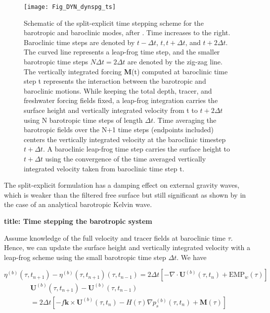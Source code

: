 \documentclass[../tex_main/NEMO_manual]{subfiles}
\begin{document}
\begin{figure}[!t] 	\begin{center}
\texttt{[image: Fig\_DYN\_dynspg\_ts]}
\caption{	 \protect\label{fig:DYN_dynspg_ts}
Schematic of the split-explicit time stepping scheme for the barotropic and baroclinic modes, 
after \citet{Griffies2004}. Time increases to the right. Baroclinic time steps are denoted by 
$t-\Delta t$, $t, t+\Delta t$, and $t+2\Delta t$. The curved line represents a leap-frog time step, 
and the smaller barotropic time steps $N \Delta t=2\Delta t$ are denoted by the zig-zag line. 
The vertically integrated forcing \textbf{M}(t) computed at baroclinic time step t represents 
the interaction between the barotropic and baroclinic motions. While keeping the total depth, 
tracer, and freshwater forcing fields fixed, a leap-frog integration carries the surface height 
and vertically integrated velocity from t to $t+2 \Delta t$ using N barotropic time steps of length 
$\Delta t$. Time averaging the barotropic fields over the N+1 time steps (endpoints included) 
centers the vertically integrated velocity at the baroclinic timestep $t+\Delta t$. 
A baroclinic leap-frog time step carries the surface height to $t+\Delta t$ using the convergence 
of the time averaged vertically integrated velocity taken from baroclinic time step t. }
\end{center}
\end{figure}

The split-explicit formulation has a damping effect on external gravity waves, which is weaker than the filtered free surface but still significant as shown by \citet{Levier2007} in the case of an analytical barotropic Kelvin wave. 


\textbf{title: Time stepping the barotropic system }

Assume knowledge of the full velocity and tracer fields at baroclinic time $\tau$. Hence, 
we can update the surface height and vertically integrated velocity with a leap-frog 
scheme using the small barotropic time step $\Delta t$. We have 

\begin{equation} \label{eq:DYN_spg_ts_eta}
\eta^{(b)}(\tau,t_{n+1}) - \eta^{(b)}(\tau,t_{n+1}) (\tau,t_{n-1})
	= 2 \Delta t \left[-\nabla \cdot \textbf{U}^{(b)}(\tau,t_n) + \text{EMP}_w(\tau) \right] 
\end{equation}
\begin{multline} \label{eq:DYN_spg_ts_u}
\textbf{U}^{(b)}(\tau,t_{n+1}) - \textbf{U}^{(b)}(\tau,t_{n-1})  \\
	= 2\Delta t \left[ - f \textbf{k} \times \textbf{U}^{(b)}(\tau,t_{n}) 
	- H(\tau) \nabla p_s^{(b)}(\tau,t_{n}) +\textbf{M}(\tau) \right]
\end{multline}
\
\end{document}
